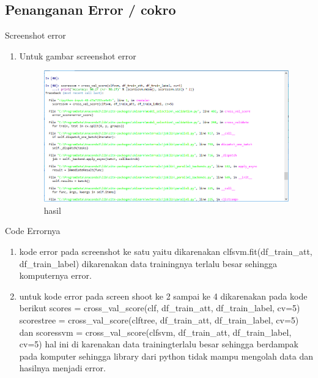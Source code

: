 \subsection{Penanganan Error / cokro}
Screenshot error
\begin{enumerate}
\item  Untuk gambar screenshot error
\begin{figure}[ht]
\centering
\includegraphics[scale=0.5]{figures/1174042/chapter3/3,1.PNG}
\caption{hasil}
\label{contoh}
\end{figure}
\end{enumerate}

Code Errornya 
\begin{enumerate}
\item kode error pada screenshot ke satu yaitu dikarenakan clfsvm.fit(df\_train\_att, df\_train\_label) dikarenakan data trainingnya terlalu besar sehingga komputernya error.
\item untuk kode error pada screen shoot ke 2 sampai ke 4 dikarenakan pada kode berikut  scores = cross\_val\_score(clf, df\_train\_att, df\_train\_label, cv=5) scorestree = cross\_val\_score(clftree, df\_train\_att, df\_train\_label, cv=5) dan  
scoressvm = cross\_val\_score(clfsvm, df\_train\_att, df\_train\_label, cv=5) hal ini di karenakan data trainingterlalu besar sehingga berdampak pada komputer sehingga library dari python tidak mampu mengolah data dan hasilnya menjadi error. 
\end{enumerate}

